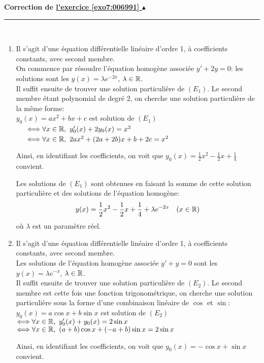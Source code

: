 \documentclass[11pt,a4paper]{article}
\newcounter{exo}
\newcommand{\correction}[1]{\hypertarget{cor7:#1}{}\label{cor7:#1}{\bf Correction de \hyperlink{exo7:#1}{l'exercice \ref{exo7:#1} $\blacktriangle$}}\vspace{1mm}\hrule\vspace{1mm}}
\begin{document}
\newpage

\correction{006991}\
\begin{enumerate}
\item Il s'agit d'une équation différentielle linéaire d'ordre 1, à coefficients constants, avec second membre.\\ 

On commence par résoudre l'équation homogène associée $y'+2y=0$: les solutions sont les $y(x)=\lambda e^{-2x}$, $\lambda\in\mathbb{R}$.\\

Il suffit ensuite de trouver une solution particulière de $(E_1)$. Le second membre étant polynomial de degré 2, on cherche une solution particulière de la m\^eme forme: \\
$y_0(x)=ax^2+bx+c$ est solution de $(E_1)$\\
\ \ \ $\Longleftrightarrow \forall x\in\R,\ y_0'(x)+2y_0(x)=x^2$ \\
\ \ \  $\Longleftrightarrow \forall x\in\R,\ 2ax^2+(2a+2b)x+b+2c=x^2$ 

\noindent Ainsi, en identifiant les coefficients, on voit que $y_0(x)=\frac{1}{2}x^2-\frac{1}{2}x+\frac{1}{4}$ convient.

Les solutions de $(E_1)$ sont obtenues en faisant la somme de cette solution particulière et des solutions 
de l'équation homogène: 
$$y(x)=\frac{1}{2}x^2-\frac{1}{2}x+\frac{1}{4}+\lambda e^{-2x}\quad (x\in\mathbb{R})$$
où $\lambda$ est un paramètre réel.
\item Il s'agit d'une équation différentielle linéaire d'ordre 1, à coefficients constants, avec second membre.\\ 


Les solutions de l'équation homogène associée $y'+y=0$ sont les $y(x)=\lambda e^{-x}$, $\lambda\in\mathbb{R}$.\\

Il suffit ensuite de trouver une solution particulière de $(E_2)$. Le second membre est cette fois une fonction trigonométrique, on cherche une solution particulière sous la forme d'une combinaison linéaire de $\cos$ et $\sin$:\\
 $y_0(x)=a\cos x+b\sin x$ est solution de $(E_2)$\\
$\Longleftrightarrow \forall x\in\R,\ y_0'(x)+y_0(x)=2\sin x$ \\
$\Longleftrightarrow \forall x\in\R,\ (a+b)\cos x+(-a+b)\sin x=2\sin x$ 

\noindent Ainsi, en identifiant les coefficients, on voit que $y_0(x)=-\cos x+\sin x$ convient.


\end{enumerate}
\end{document}

